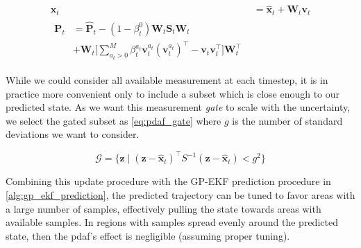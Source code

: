 \begin{subequations}
    \begin{align}
        \boldsymbol{x}_t & = \hat{\boldsymbol{x}}_t + \boldsymbol{W}_t \boldsymbol{v}_t \label{eq:pdaf_moment_mean} \\
        \begin{split}
            \boldsymbol{P}_t &= \hat{\boldsymbol{P}}_t - (1 - \beta_t^{0}) \boldsymbol{W}_t \boldsymbol{S}_t  \boldsymbol{W}_t\\ &+ \boldsymbol{W}_t \big[\sum_{a_t > 0}^M \beta_t^{a_t} \boldsymbol{v}_t^{a_t} (\boldsymbol{v}_t^{a_t})^\intercal - \boldsymbol{v}_t \boldsymbol{v}_t^\intercal \big] \boldsymbol{W}_t^\intercal\label{eq:pdaf_moment_var}
        \end{split}
    \end{align}
\end{subequations}

While we could consider all available measurement at each timestep, it is in practice more convenient only to include a subset which is close enough to our predicted state. As we want this measurement \textit{gate} to scale with the uncertainty, we select the gated subset as \cref{eq:pdaf_gate} where $g$ is the number of standard deviations we want to consider.

\begin{equation} \label{eq:pdaf_gate}
    \mathcal{G} = \big\{ \boldsymbol{z} \; | \; (\boldsymbol{z} - \hat{\boldsymbol{x}}_t)^\intercal S^{-1} (\boldsymbol{z} - \hat{\boldsymbol{x}}_t) < g^2 \big\}
\end{equation}




Combining this update procedure with the GP-EKF prediction procedure in \cref{alg:gp_ekf_prediction}, the predicted trajectory can be tuned to favor areas with a large number of samples, effectively pulling the state towards areas with available samples. In regions with samples spread evenly around the predicted state, then the \acrshort{pdaf}'s effect is negligible (assuming proper tuning).

